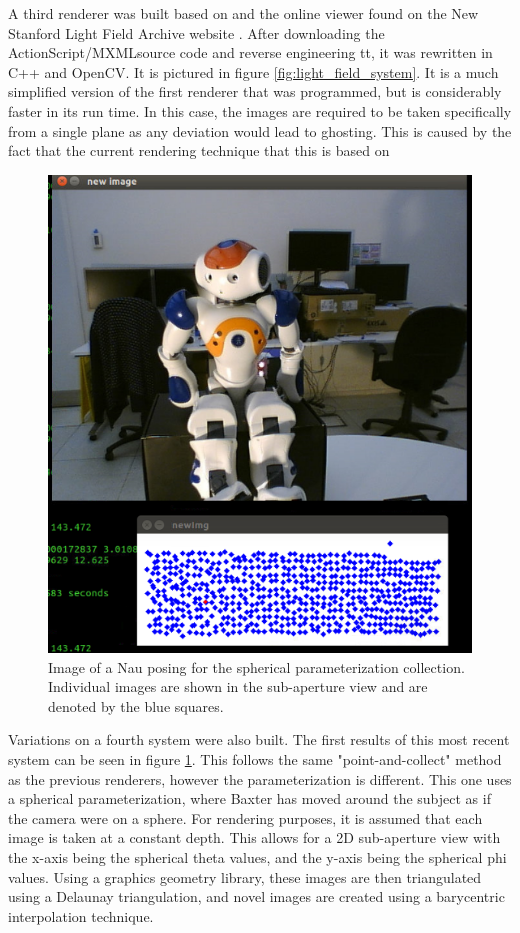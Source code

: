 \documentclass[12pt]{report}
\begin{document}
A third renderer was built based on \cite{Levoy96} and the online viewer found on the New Stanford Light Field Archive website \cite{lfArchive}. After downloading the ActionScript/MXMLsource code and reverse engineering tt, it was rewritten in C++ and OpenCV. It is pictured in figure \ref{fig:light_field_system}. It is a much simplified version of the first renderer that was programmed, but is considerably faster in its run time. In this case, the images are required to be taken specifically from a single plane as any deviation would lead to ghosting. This is caused by the fact that the current rendering technique that this is based on 

\begin{figure}[!ht]
	\centering
	\includegraphics[scale=0.50]{new_system.png}
	\caption{Image of a Nau posing for the spherical parameterization collection. Individual images are shown in the sub-aperture view and are denoted by the blue squares.}
	\label{fig:spherical_nau}
\end{figure}

Variations on a fourth system were also built. The first results of this most recent system can be seen in figure \ref{fig:spherical_nau}. This follows the same "point-and-collect" method as the previous renderers, however the parameterization is different. This one uses a spherical parameterization, where Baxter has moved around the subject as if the camera were on a sphere. For rendering purposes, it is assumed that each image is taken at a constant depth. This allows for a 2D sub-aperture view with the x-axis being the spherical theta values, and the y-axis being the spherical phi values. Using a graphics geometry library, these images are then triangulated using a Delaunay triangulation, and novel images are created using a barycentric interpolation technique.
\end{document}
